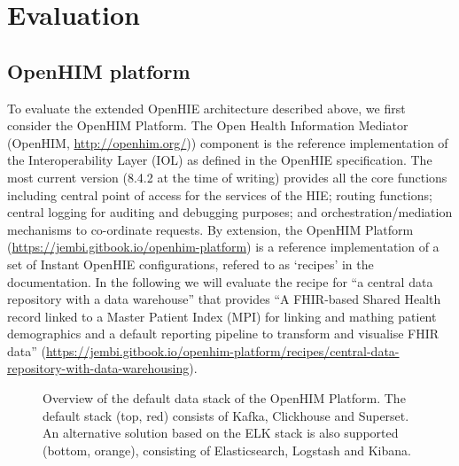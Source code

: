 \documentclass[
  authoryear]{elsarticle}
\begin{document}
\section{Evaluation}\label{evaluation}

\subsection{OpenHIM platform}\label{openhim-platform}

To evaluate the extended OpenHIE architecture described above, we first
consider the OpenHIM Platform. The Open Health Information Mediator
(OpenHIM, \href{OpenHIMhttp://openhim.org/}{http://openhim.org/}))
component is the reference implementation of the Interoperability Layer
(IOL) as defined in the OpenHIE specification. The most current version
(8.4.2 at the time of writing) provides all the core functions including
central point of access for the services of the HIE; routing functions;
central logging for auditing and debugging purposes; and
orchestration/mediation mechanisms to co-ordinate requests. By
extension, the OpenHIM Platform
(\url{https://jembi.gitbook.io/openhim-platform}) is a reference
implementation of a set of Instant OpenHIE configurations, refered to as
`recipes' in the documentation. In the following we will evaluate the
recipe for ``a central data repository with a data warehouse'' that
provides ``A FHIR-based Shared Health record linked to a Master Patient
Index (MPI) for linking and mathing patient demographics and a default
reporting pipeline to transform and visualise FHIR data''
(\url{https://jembi.gitbook.io/openhim-platform/recipes/central-data-repository-with-data-warehousing}).

\begin{figure}


\caption{\label{fig-openhim-platform}Overview of the default data stack
of the OpenHIM Platform. The default stack (top, red) consists of Kafka,
Clickhouse and Superset. An alternative solution based on the ELK stack
is also supported (bottom, orange), consisting of Elasticsearch,
Logstash and Kibana.}

\end{figure}%
\end{document}
